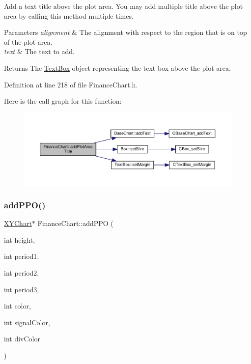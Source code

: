 Add a text title above the plot area. You may add multiple title above the plot area by calling this method multiple times. 


\begin{DoxyParams}{Parameters}
{\em alignment} & The alignment with respect to the region that is on top of the plot area.\\
\hline
{\em text} & The text to add.\\
\hline
\end{DoxyParams}
\begin{DoxyReturn}{Returns}
The \hyperlink{class_text_box}{Text\+Box} object representing the text box above the plot area.
\end{DoxyReturn}


Definition at line 218 of file Finance\+Chart.\+h.

Here is the call graph for this function\+:
\nopagebreak
\begin{figure}[H]
\begin{center}
\leavevmode
\includegraphics[width=350pt]{class_finance_chart_acf483e2850387592ab861effcd443eb6_cgraph}
\end{center}
\end{figure}
\mbox{\label{class_finance_chart_afece1b137b4d8b68e0be8255a2a914b9}} 
\subsubsection{\texorpdfstring{add\+P\+P\+O()}{addPPO()}}
{\footnotesize\ttfamily \hyperlink{class_x_y_chart}{X\+Y\+Chart}$\ast$ Finance\+Chart\+::add\+P\+PO (\begin{DoxyParamCaption}\item[{int}]{height,  }\item[{int}]{period1,  }\item[{int}]{period2,  }\item[{int}]{period3,  }\item[{int}]{color,  }\item[{int}]{signal\+Color,  }\item[{int}]{div\+Color }\end{DoxyParamCaption})\hspace{0.3cm}{\ttfamily [inline]}}



